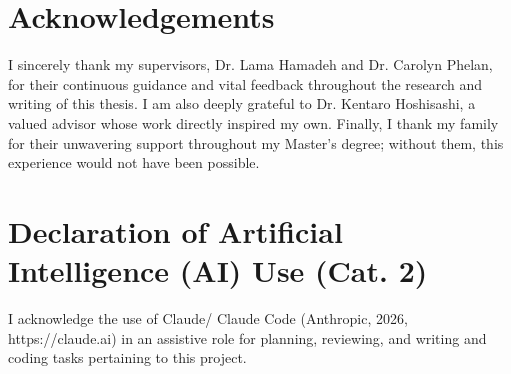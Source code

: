 \documentclass[11pt, a4paper]{article}
\begin{document}
\section*{Acknowledgements}
I sincerely thank my supervisors, Dr. Lama Hamadeh and Dr. Carolyn Phelan, for their continuous guidance and vital feedback throughout the research and writing of this thesis. I am also deeply grateful to Dr. Kentaro Hoshisashi, a valued advisor whose work directly inspired my own. Finally, I thank my family for their unwavering support throughout my Master's degree; without them, this experience would not have been possible.




\clearpage
\section*{Declaration of Artificial Intelligence (AI) Use (Cat. 2)}
I acknowledge the use of Claude/ Claude Code (Anthropic, 2026, https://claude.ai) in an assistive role for planning, reviewing, and writing and coding tasks pertaining to this project. 



\end{document}
